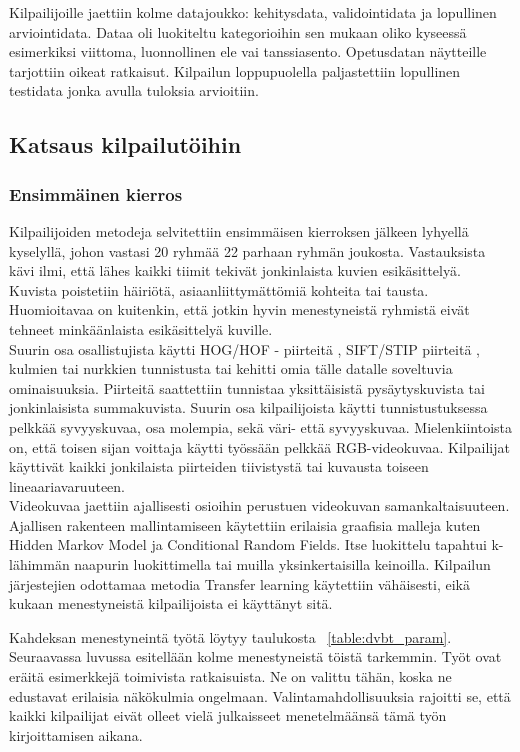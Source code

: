 Kilpailijoille jaettiin kolme datajoukko: kehitysdata, validointidata ja lopullinen arviointidata. Dataa oli luokiteltu kategorioihin sen mukaan
oliko kyseessä esimerkiksi viittoma, luonnollinen ele vai tanssiasento. Opetusdatan näytteille tarjottiin oikeat ratkaisut.
Kilpailun loppupuolella paljastettiin lopullinen testidata jonka avulla tuloksia arvioitiin.
\citep {6239178} \\


\subsection{Katsaus kilpailutöihin}
\subsubsection {Ensimmäinen kierros}
Kilpailijoiden metodeja selvitettiin ensimmäisen kierroksen jälkeen lyhyellä kyselyllä, johon vastasi 20 ryhmää 22 parhaan ryhmän joukosta.
Vastauksista kävi ilmi, että lähes kaikki tiimit tekivät jonkinlaista kuvien esikäsittelyä. Kuvista poistetiin häiriötä, asiaanliittymättömiä 
kohteita tai tausta. Huomioitavaa on kuitenkin, että jotkin hyvin menestyneistä ryhmistä eivät tehneet minkäänlaista esikäsittelyä kuville.\\

Suurin osa osallistujista käytti HOG/HOF - piirteitä \citep {}, SIFT/STIP piirteitä \citep {}, kulmien tai nurkkien tunnistusta tai kehitti omia tälle datalle 
soveltuvia ominaisuuksia. Piirteitä saattettiin tunnistaa yksittäisistä pysäytyskuvista tai jonkinlaisista summakuvista.
Suurin osa kilpailijoista käytti tunnistustuksessa pelkkää syvyyskuvaa, osa molempia, sekä väri- että syvyyskuvaa. 
Mielenkiintoista on, että toisen sijan voittaja käytti työssään pelkkää RGB-videokuvaa. 
Kilpailijat käyttivät kaikki jonkilaista piirteiden tiivistystä tai kuvausta toiseen lineaariavaruuteen.\\

Videokuvaa jaettiin ajallisesti osioihin perustuen videokuvan samankaltaisuuteen. Ajallisen rakenteen mallintamiseen käytettiin erilaisia graafisia malleja
kuten Hidden Markov Model ja Conditional Random Fields. Itse luokittelu tapahtui k-lähimmän naapurin luokittimella tai muilla yksinkertaisilla keinoilla. 
Kilpailun järjestejien odottamaa metodia Transfer learning käytettiin vähäisesti, eikä kukaan menestyneistä kilpailijoista ei käyttänyt sitä. \\
\citep {6239178} 

Kahdeksan menestyneintä työtä löytyy taulukosta ~\ref{table:dvbt_param}. Seuraavassa luvussa esitellään kolme menestyneistä töistä tarkemmin.
Työt ovat eräitä esimerkkejä toimivista ratkaisuista. Ne on valittu tähän, koska ne edustavat erilaisia näkökulmia ongelmaan. Valintamahdollisuuksia
rajoitti se, että kaikki kilpailijat eivät olleet vielä julkaisseet menetelmäänsä tämä työn kirjoittamisen aikana.\\\


